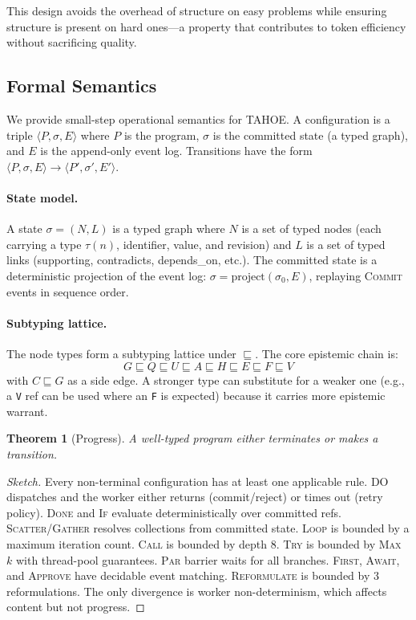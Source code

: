 \documentclass[11pt,a4paper]{article}
\newtheorem{theorem}{Theorem}
\begin{document}
This design avoids the overhead of structure on easy problems while ensuring structure is present on hard ones---a property that contributes to token efficiency without sacrificing quality.

\subsection{Formal Semantics}
\label{subsec:formal}

We provide small-step operational semantics for TAHOE.
A configuration is a triple $\langle P, \sigma, E \rangle$ where $P$ is the program, $\sigma$ is the committed state (a typed graph), and $E$ is the append-only event log.
Transitions have the form $\langle P, \sigma, E \rangle \to \langle P', \sigma', E' \rangle$.

\paragraph{State model.}
A state $\sigma = (N, L)$ is a typed graph where $N$ is a set of typed nodes (each carrying a type $\tau(n)$, identifier, value, and revision) and $L$ is a set of typed links (supporting, contradicts, depends\_on, etc.).
The committed state is a deterministic projection of the event log: $\sigma = \text{project}(\sigma_0, E)$, replaying \textsc{Commit} events in sequence order.

\paragraph{Subtyping lattice.}
The node types form a subtyping lattice under $\sqsubseteq$.
The core epistemic chain is:
\[
G \sqsubseteq Q \sqsubseteq U \sqsubseteq A \sqsubseteq H \sqsubseteq E \sqsubseteq F \sqsubseteq V
\]
with $C \sqsubseteq G$ as a side edge.
A stronger type can substitute for a weaker one (e.g., a \texttt{V} ref can be used where an \texttt{F} is expected) because it carries more epistemic warrant.

\begin{theorem}[Progress]
A well-typed program either terminates or makes a transition.
\end{theorem}

\begin{proof}[Sketch]
Every non-terminal configuration has at least one applicable rule.
\textsc{DO} dispatches and the worker either returns (commit/reject) or times out (retry policy).
\textsc{Done} and \textsc{If} evaluate deterministically over committed refs.
\textsc{Scatter}/\textsc{Gather} resolves collections from committed state.
\textsc{Loop} is bounded by a maximum iteration count.
\textsc{Call} is bounded by depth 8.
\textsc{Try} is bounded by \textsc{Max}~$k$ with thread-pool guarantees.
\textsc{Par} barrier waits for all branches.
\textsc{First}, \textsc{Await}, and \textsc{Approve} have decidable event matching.
\textsc{Reformulate} is bounded by 3 reformulations.
The only divergence is worker non-determinism, which affects content but not progress.
\end{proof}
\end{document}
